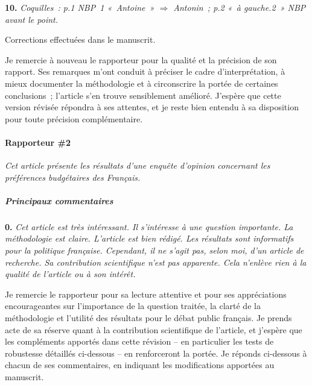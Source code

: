 \documentclass[12pt,french]{article}
\begin{document}
\bigskip
\noindent\textbf{10.} \textit{Coquilles~: p.1 NBP~1 «~Antoine~» $\Rightarrow$ Antonin~; p.2 «~à gauche.2~» NBP avant le point.}

Corrections effectuées dans le manuscrit.

\bigskip
\noindent Je remercie à nouveau le rapporteur pour la qualité et la précision de son rapport. Ses remarques m'ont conduit à préciser le cadre d'interprétation, à mieux documenter la méthodologie et à circonscrire la portée de certaines conclusions~; l'article s'en trouve sensiblement amélioré. J'espère que cette version révisée répondra à ses attentes, et je reste bien entendu à sa disposition pour toute précision complémentaire.

\bigskip

\paragraph*{Rapporteur \#2}

\textit{Cet article présente les résultats d'une enquête d'opinion concernant les préférences budgétaires des Français.}

\subparagraph*{Principaux commentaires}

\bigskip
\noindent\textbf{0.} \textit{Cet article est très intéressant. Il s'intéresse à une question importante. La méthodologie est claire. L'article est bien rédigé. Les résultats sont informatifs pour la politique française. Cependant, il ne s'agit pas, selon moi, d'un article de recherche. Sa contribution scientifique n'est pas apparente. Cela n'enlève rien à la qualité de l'article ou à son intérêt.}

Je remercie le rapporteur pour sa lecture attentive et pour ses appréciations encourageantes sur l'importance de la question traitée, la clarté de la méthodologie et l'utilité des résultats pour le débat public français. Je prends acte de sa réserve quant à la contribution scientifique de l'article, et j'espère que les compléments apportés dans cette révision -- en particulier les tests de robustesse détaillés ci-dessous -- en renforceront la portée. Je réponds ci-dessous à chacun de ses commentaires, en indiquant les modifications apportées au manuscrit.
\end{document}
